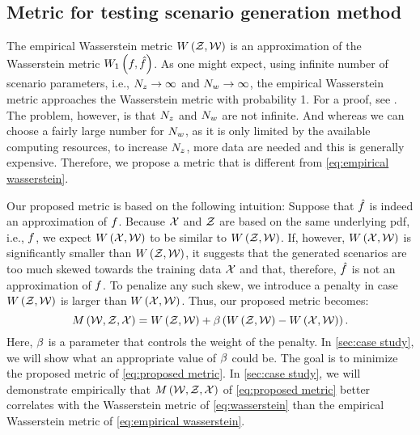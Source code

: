 \subsection{Metric for testing scenario generation method}
\label{sec:metric scenario generation method}

The empirical Wasserstein metric $W\left(\mathcal{Z},\mathcal{W}\right)$ is an approximation of the Wasserstein metric $W_{1}\left(f,\hat{f}\right)$.
As one might expect, using infinite number of scenario parameters, i.e., $N_z\rightarrow\infty$ and $N_w\rightarrow\infty$, the empirical Wasserstein metric approaches the Wasserstein metric with probability 1. 
For a proof, see \autocite{sommerfeld2018inference}.
The problem, however, is that $N_z$ and $N_w$ are not infinite. 
And whereas we can choose a fairly large number for $N_w$, as it is only limited by the available computing resources, to increase $N_z$, more data are needed and this is generally expensive. Therefore, we propose a metric that is different from \cref{eq:empirical wasserstein}.

Our proposed metric is based on the following intuition: Suppose that $\hat{f}$ is indeed an approximation of $f$. 
Because $\mathcal{X}$ and $\mathcal{Z}$ are based on the same underlying \ac{pdf}, i.e., $f$, we expect $W\left(\mathcal{X},\mathcal{W}\right)$ to be similar to $W\left(\mathcal{Z},\mathcal{W}\right)$.
If, however, $W\left(\mathcal{X},\mathcal{W}\right)$ is significantly smaller than $W\left(\mathcal{Z},\mathcal{W}\right)$, it suggests that the generated scenarios are too much skewed towards the training data $\mathcal{X}$ and that, therefore, $\hat{f}$ is not an approximation of $f$.
To penalize any such skew, we introduce a penalty in case $W\left(\mathcal{Z},\mathcal{W}\right)$ is larger than $W\left(\mathcal{X},\mathcal{W}\right)$.
Thus, our proposed metric becomes:
\begin{equation}
	\label{eq:proposed metric}
	M\left(\mathcal{W},\mathcal{Z},\mathcal{X}\right)
	= W\left(\mathcal{Z},\mathcal{W}\right) +
	\beta\left( W\left(\mathcal{Z},\mathcal{W}\right) - W\left(\mathcal{X},\mathcal{W}\right) \right).
\end{equation}
Here, $\beta$ is a parameter that controls the weight of the penalty. 
In \cref{sec:case study}, we will show what an appropriate value of $\beta$ could be.
The goal is to minimize the proposed metric of \cref{eq:proposed metric}.
In \cref{sec:case study}, we will demonstrate empirically that $M\left(\mathcal{W},\mathcal{Z},\mathcal{X}\right)$ of \cref{eq:proposed metric} better correlates with the Wasserstein metric of \cref{eq:wasserstein} than the empirical Wasserstein metric of \cref{eq:empirical wasserstein}.
